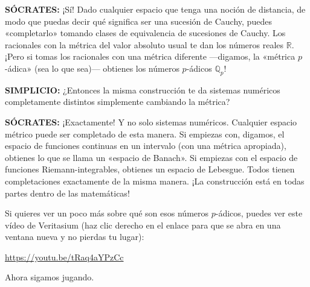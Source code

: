 \medskip
\noindent\textbf{SÓCRATES:} ¡Sí! Dado cualquier espacio que tenga una noción de distancia, de modo que puedas decir qué significa ser una sucesión de Cauchy, puedes «completarlo» tomando clases de equivalencia de sucesiones de Cauchy. Los racionales con la métrica del valor absoluto usual te dan los números reales $\mathbb{R}$. ¡Pero si tomas los racionales con una métrica diferente —digamos, la «métrica $p$-ádica» (sea lo que sea)— obtienes los números $p$-ádicos $\mathbb{Q}_p$!

\medskip
\noindent\textbf{SIMPLICIO:} ¿Entonces la misma construcción te da sistemas numéricos completamente distintos simplemente cambiando la métrica?

\medskip
\noindent\textbf{SÓCRATES:} ¡Exactamente! Y no solo sistemas numéricos. Cualquier espacio métrico puede ser completado de esta manera. Si empiezas con, digamos, el espacio de funciones continuas en un intervalo (con una métrica apropiada), obtienes lo que se llama un «espacio de Banach». Si empiezas con el espacio de funciones Riemann-integrables, obtienes un espacio de Lebesgue. Todos tienen completaciones exactamente de la misma manera. ¡La construcción está en todas partes dentro de las matemáticas!

Si quieres ver un poco más sobre qué son esos números $p$-ádicos, puedes ver este vídeo de Veritasium (haz clic derecho en el enlace para que se abra en una ventana nueva y no pierdas tu lugar):

\begin{center}
  \url{https://youtu.be/tRaq4aYPzCc}
\end{center}

Ahora sigamos jugando.

